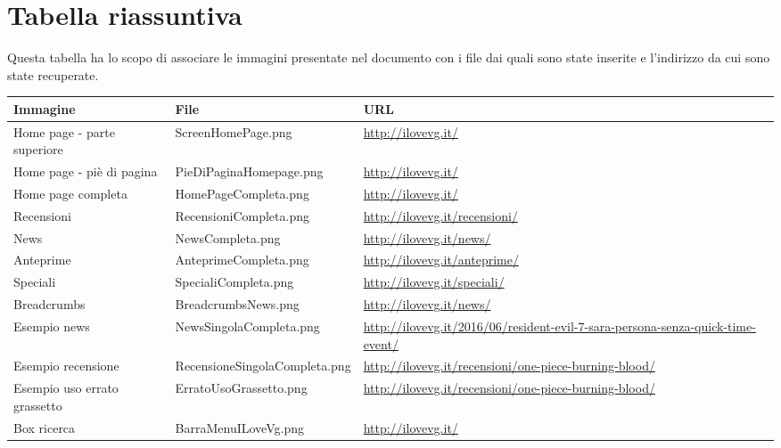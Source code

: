 \documentclass[../ProgettoTecWeb2.tex]{subfiles}
\begin{document}
\section{Tabella riassuntiva}
	Questa tabella ha lo scopo di associare le immagini presentate nel documento con i file dai quali sono state inserite e l'indirizzo da cui sono state recuperate.
	\begin{longtabu} to \textwidth {X[l m 0.5] X[l m 1.3] X[l m]}
		\toprule
		\textbf{Immagine} & \textbf{File}  & \textbf{URL}\\
		\midrule
		\endhead

	Home page - parte superiore & ScreenHomePage.png & \href{http://ilovevg.it/}{http://ilovevg.it/}\\ 
	\midrule
	Home page - piè di pagina & PieDiPaginaHomepage.png & \href{http://ilovevg.it/}{http://ilovevg.it/}\\ 
	\midrule
	Home page completa & HomePageCompleta.png & \href{http://ilovevg.it/}{http://ilovevg.it/}\\
	\midrule
	Recensioni & RecensioniCompleta.png & \href{http://ilovevg.it/recensioni/}{http://ilovevg.it/recensioni/}\\
	\midrule
	News & NewsCompleta.png & \href{http://ilovevg.it/news/}{http://ilovevg.it/news/}\\
	\midrule
	Anteprime & AnteprimeCompleta.png & \href{http://ilovevg.it/anteprime/}{http://ilovevg.it/anteprime/}\\	
	\midrule
	Speciali & SpecialiCompleta.png & \href{http://ilovevg.it/speciali/}{http://ilovevg.it/speciali/}\\
	\midrule
	Breadcrumbs & BreadcrumbsNews.png & \href{http://ilovevg.it/news/}{http://ilovevg.it/news/}\\
	\midrule
	Esempio news & NewsSingolaCompleta.png & \href{http://ilovevg.it/2016/06/resident-evil-7-sara-persona-senza-quick-time-event/}{http://ilovevg.it/2016/06/resident-evil-7-sara-persona-senza-quick-time-event/}\\
	\midrule
	Esempio recensione & RecensioneSingolaCompleta.png & \href{http://ilovevg.it/recensioni/one-piece-burning-blood/}{http://ilovevg.it/recensioni/one-piece-burning-blood/}\\
	\midrule
	Esempio uso errato grassetto & ErratoUsoGrassetto.png & \href{http://ilovevg.it/recensioni/one-piece-burning-blood/}{http://ilovevg.it/recensioni/one-piece-burning-blood/}\\
	\midrule
	Box ricerca & BarraMenuILoveVg.png & \href{http://ilovevg.it/}{http://ilovevg.it/}\\ 

\end{longtabu}
\end{document}
